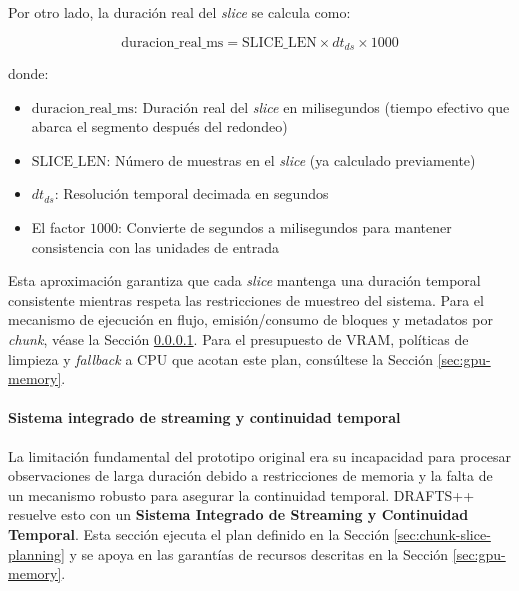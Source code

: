 Por otro lado, la duración real del \emph{slice} se calcula como:

\[
\text{duracion\_real\_ms} = \text{SLICE\_LEN} \times dt_{ds} \times 1000
\]

donde:
\begin{itemize}
    \item $\text{duracion\_real\_ms}$: Duración real del \emph{slice} en milisegundos (tiempo efectivo que abarca el segmento después del redondeo)
    \item $\text{SLICE\_LEN}$: Número de muestras en el \emph{slice} (ya calculado previamente)
    \item $dt_{ds}$: Resolución temporal decimada en segundos
    \item El factor $1000$: Convierte de segundos a milisegundos para mantener consistencia con las unidades de entrada
\end{itemize}

Esta aproximación garantiza que cada \emph{slice} mantenga una duración temporal consistente mientras respeta las restricciones de muestreo del sistema. Para el mecanismo de ejecución en flujo, emisión/consumo de bloques y metadatos por \emph{chunk}, véase la Sección \ref{sec:streaming-continuity}. Para el presupuesto de VRAM, políticas de limpieza y \textit{fallback} a CPU que acotan este plan, consúltese la Sección \ref{sec:gpu-memory}.

\paragraph{Sistema integrado de streaming y continuidad temporal}\label{sec:streaming-continuity}

La limitación fundamental del prototipo original era su incapacidad para procesar observaciones de larga duración debido a restricciones de memoria y la falta de un mecanismo robusto para asegurar la continuidad temporal. DRAFTS++ resuelve esto con un \textbf{Sistema Integrado de Streaming y Continuidad Temporal}. Esta sección ejecuta el plan definido en la Sección \ref{sec:chunk-slice-planning} y se apoya en las garantías de recursos descritas en la Sección \ref{sec:gpu-memory}.

